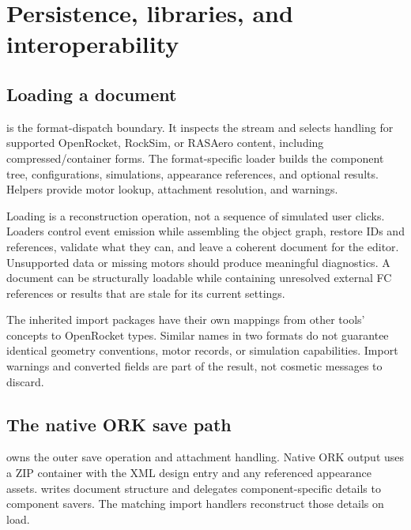 \chapter{Persistence, libraries, and interoperability}\label{ch:persistence}
\section{Loading a document}
 is the format-dispatch boundary. It inspects the stream and selects handling for supported OpenRocket, RockSim, or RASAero content, including compressed/container forms. The format-specific loader builds the component tree, configurations, simulations, appearance references, and optional results. Helpers provide motor lookup, attachment resolution, and warnings.

Loading is a reconstruction operation, not a sequence of simulated user clicks. Loaders control event emission while assembling the object graph, restore IDs and references, validate what they can, and leave a coherent document for the editor. Unsupported data or missing motors should produce meaningful diagnostics. A document can be structurally loadable while containing unresolved external FC references or results that are stale for its current settings.

The inherited import packages have their own mappings from other tools' concepts to OpenRocket types. Similar names in two formats do not guarantee identical geometry conventions, motor records, or simulation capabilities. Import warnings and converted fields are part of the result, not cosmetic messages to discard.


\section{The native ORK save path}
 owns the outer save operation and attachment handling. Native ORK output uses a ZIP container with the XML design entry  and any referenced appearance assets.  writes document structure and delegates component-specific details to component savers. The matching import handlers reconstruct those details on load.

